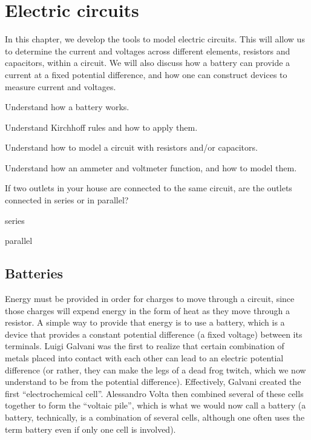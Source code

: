 
\chapter{Electric circuits}
\label{chapter:circuits}
In this chapter, we develop the tools to model electric circuits. This will allow us to determine the current and voltages across different elements, resistors and capacitors, within a circuit. We will also discuss how a battery can provide a current at a fixed potential difference, and how one can construct devices to measure current and voltages.

\begin{learningObjectives}{
 \item Understand how a battery works.
 \item Understand Kirchhoff rules and how to apply them.
 \item Understand how to model a circuit with resistors and/or capacitors.
 \item Understand how an ammeter and voltmeter function, and how to model them.
 }
\end{learningObjectives}

\begin{opening}
\begin{MCquestion}{If two outlets in your house are connected to the same circuit, are the outlets connected in series or in parallel?}
\item series
\item parallel \correct
\end{MCquestion}
\end{opening}

\section{Batteries}
Energy must be provided in order for charges to move through a circuit, since those charges will expend energy in the form of heat as they move through a resistor. A simple way to provide that energy is to use a battery, which is a device that provides a constant potential difference (a fixed voltage) between its terminals. Luigi Galvani was the first to realize that certain combination of metals placed into contact with each other can lead to an electric potential difference (or rather, they can make the legs of a dead frog twitch, which we now understand to be from the potential difference). Effectively, Galvani created the first ``electrochemical cell''. Alessandro Volta then combined several of these cells together to form the ``voltaic pile'', which is what we would now call a battery (a battery, technically, is a combination of several cells, although one often uses the term battery even if only one cell is involved). 
